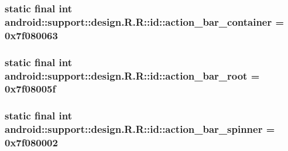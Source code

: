 \hypertarget{classandroid_1_1support_1_1design_1_1_r_1_1id_4f0bc7019b1a4d62a26028cea870b197}{
\subsubsection[{action\_\-bar\_\-container}]{\setlength{\rightskip}{0pt plus 5cm}static final int android::support::design.R.R::id::action\_\-bar\_\-container = 0x7f080063}}
\label{classandroid_1_1support_1_1design_1_1_r_1_1id_4f0bc7019b1a4d62a26028cea870b197}


\hypertarget{classandroid_1_1support_1_1design_1_1_r_1_1id_fe6825449ac526fae062a2ac6358ebe2}{
\subsubsection[{action\_\-bar\_\-root}]{\setlength{\rightskip}{0pt plus 5cm}static final int android::support::design.R.R::id::action\_\-bar\_\-root = 0x7f08005f}}
\label{classandroid_1_1support_1_1design_1_1_r_1_1id_fe6825449ac526fae062a2ac6358ebe2}


\hypertarget{classandroid_1_1support_1_1design_1_1_r_1_1id_2475bef8afd54ad01faaf5748d493575}{
\subsubsection[{action\_\-bar\_\-spinner}]{\setlength{\rightskip}{0pt plus 5cm}static final int android::support::design.R.R::id::action\_\-bar\_\-spinner = 0x7f080002}}
\label{classandroid_1_1support_1_1design_1_1_r_1_1id_2475bef8afd54ad01faaf5748d493575}


